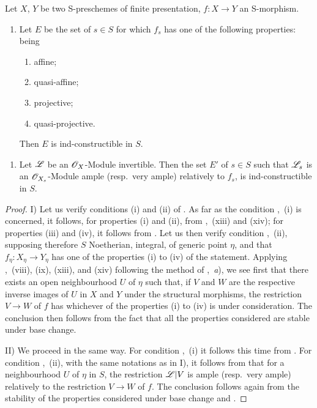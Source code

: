 \begin{proposition}[9.6.2]
\label{IV.9.6.2}
Let $X$, $Y$ be two S-preschemes of finite presentation, $f:X\to Y$ an S-morphism.
\begin{enumerate}[label=\upshape{I)}]
  \item Let $E$ be the set of $s\in S$ for which $f_s$ has one of the following properties: being
  \begin{enumerate}[label=\textup{(\roman*)}]
    \item affine;
    \item quasi-affine;
    \item projective;
    \item quasi-projective.
  \end{enumerate}
  Then $E$ is ind-constructible in $S$.
\end{enumerate}


\begin{enumerate}[label=\upshape{II)}]
  \item Let $\mathscr{L}$ be an $\mathscr{O}_X$-Module invertible.
  Then the set $E'$ of $s\in S$ such that $\mathscr{L}_s$ is an $\mathscr{O}_{X_s}$-Module ample \textup{(resp.}\ very ample\textup{)} relatively to $f_s$, is ind-constructible in $S$.
\end{enumerate}
\end{proposition}

\begin{proof}
I) Let us verify conditions (i) and (ii) of .
As far as the condition ,~(i) is concerned, it follows, for properties (i) and (ii), from ,~(xiii) and (xiv); for properties (iii) and (iv), it follows from .
Let us then verify condition ,~(ii), supposing therefore $S$ Noetherian, integral, of generic point $\eta$, and that $f_\eta:X_\eta\to Y_\eta$ has one of the properties (i) to (iv) of the statement.
Applying ,~(viii), (ix), (xiii), and (xiv) following the method of ,~\emph{a}), we see first that there exists an open neighbourhood $U$ of $\eta$ such that, if $V$ and $W$ are the respective inverse images of $U$ in $X$ and $Y$ under the structural morphisms, the restriction $V\to W$ of $f$ has whichever of the properties (i) to (iv) is under consideration.
The conclusion then follows from the fact that all the properties considered are stable under base change.

II) We proceed in the same way.
For condition ,~(i) it follows this time from .
For condition ,~(ii), with the same notations as in I), it follows from  that for a neighbourhood $U$ of $\eta$ in $S$, the restriction $\mathscr{L}|V$ is ample (resp.\ very ample) relatively to the restriction $V\to W$ of $f$.
The conclusion follows again from the stability of the properties considered under base change  and .
\end{proof}

